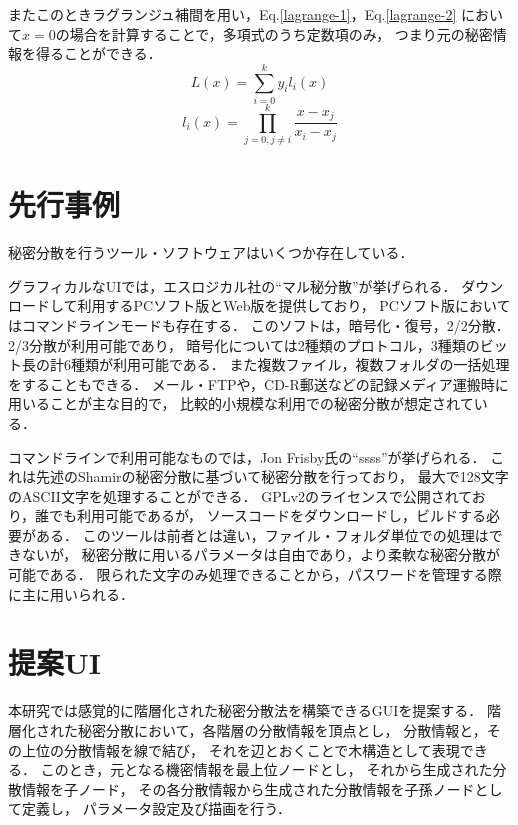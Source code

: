 \documentclass[twocolumn, fleqn, uplatex]{jsarticle}
\begin{document}
またこのときラグランジュ補間を用い，Eq.\ref{lagrange-1}，Eq.\ref{lagrange-2}%
において$x=0$の場合を計算することで，多項式のうち定数項のみ，%
つまり元の秘密情報を得ることができる．
%
\begin{equation}
L(x) = \sum_{i=0}^{k}y_{i}l_{i}(x) \label{lagrange-1}
\end{equation}
%
\begin{equation}
l_{i}(x) = \prod_{j=0,j{\neq}i}^{k}{\frac{x-x_{j}}{x_{i}-x_{j}}} \label{lagrange-2}
\end{equation}

\section{先行事例}
秘密分散を行うツール・ソフトウェアはいくつか存在している．

グラフィカルなUIでは，エスロジカル社の``マル秘分散''\cite{lit:maruhi}が挙げられる．%
ダウンロードして利用するPCソフト版とWeb版を提供しており，%
PCソフト版においてはコマンドラインモードも存在する．%
このソフトは，暗号化・復号，2/2分散．2/3分散が利用可能であり，%
暗号化については2種類のプロトコル，3種類のビット長の計6種類が利用可能である．
また複数ファイル，複数フォルダの一括処理をすることもできる．
メール・FTPや，CD-R郵送などの記録メディア運搬時に用いることが主な目的で，%
比較的小規模な利用での秘密分散が想定されている．

コマンドラインで利用可能なものでは，Jon Frisby氏の``ssss''\cite{lit:ssss}が挙げられる．%
これは先述のShamirの秘密分散に基づいて秘密分散を行っており，%
最大で128文字のASCII文字を処理することができる．
GPLv2のライセンスで公開されており，誰でも利用可能であるが，%
ソースコードをダウンロードし，ビルドする必要がある．%
このツールは前者とは違い，ファイル・フォルダ単位での処理はできないが，%
秘密分散に用いるパラメータは自由であり，より柔軟な秘密分散が可能である．%
限られた文字のみ処理できることから，パスワードを管理する際に主に用いられる．

\section{提案UI}
本研究では感覚的に階層化された秘密分散法を構築できるGUIを提案する．%
階層化された秘密分散において，各階層の分散情報を頂点とし，%
分散情報と，その上位の分散情報を線で結び，%
それを辺とおくことで木構造として表現できる．
このとき，元となる機密情報を最上位ノードとし，%
それから生成された分散情報を子ノード，%
その各分散情報から生成された分散情報を子孫ノードとして定義し，%
パラメータ設定及び描画を行う．
\end{document}
